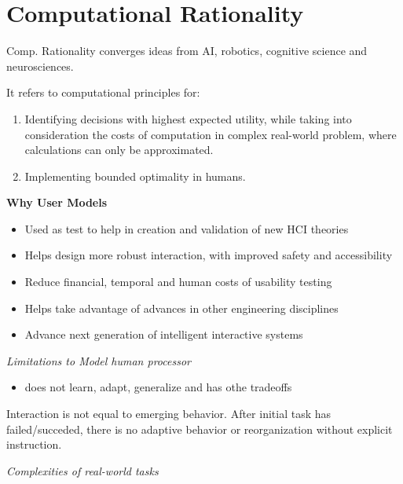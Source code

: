 \section{Computational Rationality}

Comp. Rationality converges ideas from AI, robotics, cognitive science and neurosciences. 

It refers to computational principles for:
\begin{enumerate}[itemsep=-5pt, topsep=-20pt, leftmargin=*]
    \item Identifying decisions with highest expected utility, while taking into consideration the costs of computation in complex real-world problem, where calculations can only be approximated.
    \item Implementing bounded optimality in humans. 
\end{enumerate}

\textbf{Why User Models}

\begin{itemize}[itemsep=-5pt, topsep=-20pt, leftmargin=*]
	\item Used as test to help in creation and validation of new HCI theories
	\item Helps design more robust interaction, with improved safety and accessibility
	\item Reduce financial, temporal and human costs of usability testing
	\item Helps take advantage of advances in other engineering disciplines
	\item Advance next generation of intelligent interactive systems
\end{itemize}

\textit{Limitations to Model human processor} \smallskip

\begin{itemize}[itemsep=-5pt, topsep=-20pt, leftmargin=*]
	\item does not learn, adapt, generalize and has othe tradeoffs
\end{itemize}
Interaction is not equal to emerging behavior. After initial task has failed/succeded, there is no adaptive behavior or reorganization without explicit instruction.

\textit{Complexities of real-world tasks} \smallskip

